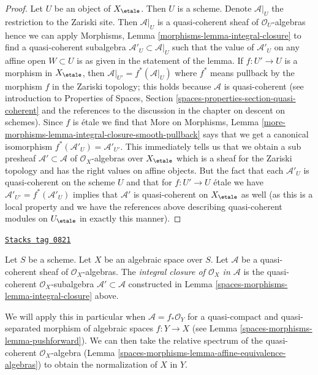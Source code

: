 \begin{proof}
Let $U$ be an object of $X_\etale$. Then $U$ is a scheme. Denote
$\mathcal{A}|_U$ the restriction to the Zariski site. Then
$\mathcal{A}|_U$ is a quasi-coherent sheaf of $\mathcal{O}_U$-algebras
hence we can apply Morphisms, Lemma \ref{morphisms-lemma-integral-closure}
to find a quasi-coherent subalgebra $\mathcal{A}'_U \subset \mathcal{A}|_U$
such that the value of $\mathcal{A}'_U$ on any affine open $W \subset U$
is as given in the statement of the lemma. If $f : U' \to U$ is a morphism
in $X_\etale$, then $\mathcal{A}|_{U'} = f^*(\mathcal{A}|_U)$
where $f^*$ means pullback by the morphism $f$ in the Zariski topology;
this holds because $\mathcal{A}$ is quasi-coherent (see introduction
to Properties of Spaces, Section \ref{spaces-properties-section-quasi-coherent}
and the references to the discussion in the chapter on
descent on schemes). Since $f$ is \'etale we find that
More on Morphisms, Lemma
\ref{more-morphisms-lemma-integral-closure-smooth-pullback}
says that we get a canonical isomorphism
$f^*(\mathcal{A}'_U) = \mathcal{A}'_{U'}$.
This immediately tells us that we obtain a sub presheaf
$\mathcal{A}' \subset \mathcal{A}$ of $\mathcal{O}_X$-algebras
over $X_\etale$ which is a sheaf for the Zariski
topology and has the right values on affine objects.
But the fact that each $\mathcal{A}'_U$ is quasi-coherent
on the scheme $U$ and that for $f : U' \to U$ \'etale we have
$\mathcal{A}'_{U'} = f^*(\mathcal{A}'_U)$ implies that $\mathcal{A}'$
is quasi-coherent on $X_\etale$ as well (as this is a local property
and we have the references above describing quasi-coherent modules
on $U_\etale$ in exactly this manner).
\end{proof}

\begin{definition}
\label{spaces-morphisms-definition-integral-closure}
\href{https://stacks.math.columbia.edu/tag/0821}{\texttt{Stacks tag 0821}}

Let $S$ be a scheme. Let $X$ be an algebraic space over $S$.
Let $\mathcal{A}$ be a quasi-coherent sheaf of $\mathcal{O}_X$-algebras.
The {\it integral closure of $\mathcal{O}_X$ in $\mathcal{A}$} is the
quasi-coherent $\mathcal{O}_X$-subalgebra $\mathcal{A}' \subset \mathcal{A}$
constructed in Lemma \ref{spaces-morphisms-lemma-integral-closure} above.
\end{definition}

We will apply this in particular when $\mathcal{A} = f_*\mathcal{O}_Y$
for a quasi-compact and quasi-separated morphism of algebraic spaces
$f : Y \to X$ (see Lemma \ref{spaces-morphisms-lemma-pushforward}). We can then take
the relative spectrum of the quasi-coherent $\mathcal{O}_X$-algebra
(Lemma \ref{spaces-morphisms-lemma-affine-equivalence-algebras}) to obtain the
normalization of $X$ in $Y$.

